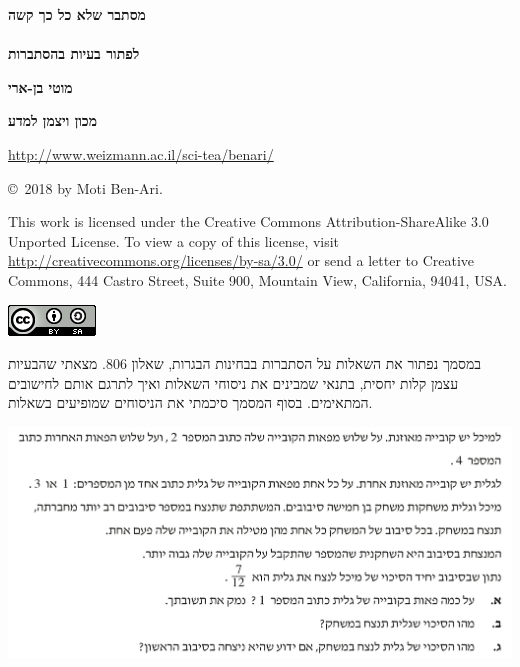 \documentclass[12pt,a4paper]{article}
\begin{document}
\thispagestyle{empty}


\begin{center}
\textbf{\Huge מסתבר שלא כל כך קשה\\\mbox{}\\לפתור בעיות בהסתברות}

\bigskip
\bigskip
\bigskip

\textbf{\Large מוטי בן-ארי}

\bigskip

\textbf{\Large מכון ויצמן למדע}

\bigskip

\url{http://www.weizmann.ac.il/sci-tea/benari/}

\bigskip

\end{center}


\vfill

\begin{center}
\sffamily\copyright{}\  2018 by Moti Ben-Ari.
\end{center}

\begin{footnotesize}
\sffamily
This work is licensed under the Creative Commons Attribution-ShareAlike 3.0 Unported License. To view a copy of this license, visit \url{http://creativecommons.org/licenses/by-sa/3.0/} or send a letter to Creative Commons, 444 Castro Street, Suite 900, Mountain View, California, 94041, USA.
\end{footnotesize}

\begin{center}
\includegraphics[width=.2\textwidth]{../by-sa.png}
\end{center}

\newpage
{}


במסמך נפתור את השאלות על הסתברות בבחינות הבגרות, שאלון
$806$.
מצאתי שהבעיות עצמן קלות יחסית, בתנאי שמבינים את ניסוחי השאלות ואיך לתרגם אותם לחישובים המתאימים. בסוף המסמך סיכמתי את הניסוחים שמופיעים בשאלות.




\textbf{}

\begin{center}
\includegraphics[width=\textwidth]{winter-2018-3}
\end{center}
\end{document}

